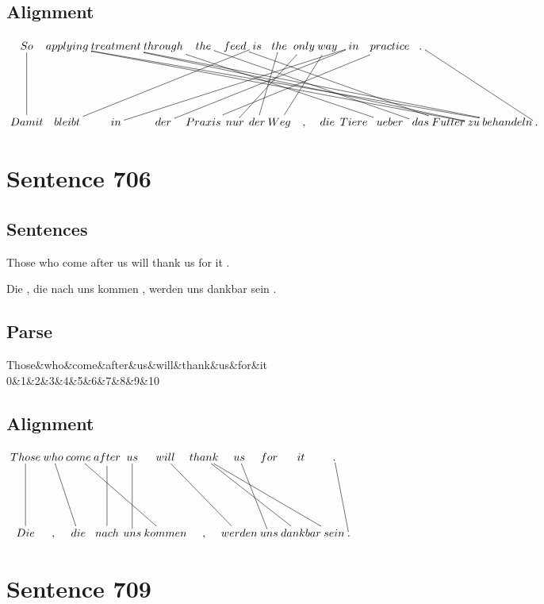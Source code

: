 \documentclass{report}
\begin{document}
\subsection*{Alignment}
\scriptsize{
$
\xymatrix@C-2.3pc{
So \ar @{-} [dd] & applying \ar @{-} [ddrrrrrrrrrrrrr] \ar @{-} [ddrrrrrrrrrrrrrr] & treatment \ar @{-} [ddrrrrrrrrrrrrr] \ar @{-} [ddrrrrrrrrrrrr] & through \ar @{-} [ddrrrrrrrr] & the \ar @{-} [ddrrrrrrrr] & feed \ar @{-} [ddrrrrrrrr] & is \ar @{-} [ddlllll] & the \ar @{-} [ddl] & only \ar @{-} [ddlll] & way \ar @{-} [ddll] & in \ar @{-} [ddlllllll] \ar @{-} [ddllllllll] & practice \ar @{-} [ddlllllll] & . \ar @{-} [ddrrrr]\\\\
Damit & bleibt & in & der & Praxis & nur & der & Weg & , & die & Tiere & ueber & das & Futter & zu & behandeln & .
}$}
\newpage\section*{Sentence 706}

\subsection*{Sentences}
Those who come after us will thank us for it .

\noindent Die , die nach uns kommen , werden uns dankbar sein .



\subsection*{Parse}
\begin{dependency}[theme=simple]
\begin{deptext}[column sep=.5cm, row sep=.1ex]
Those\&who\&come\&after\&us\&will\&thank\&us\&for\&it\\
0\&1\&2\&3\&4\&5\&6\&7\&8\&9\&10\\
\end{deptext}
\end{dependency}


\subsection*{Alignment}
\scriptsize{
$
\xymatrix@C-2.3pc{
Those \ar @{-} [dd] & who \ar @{-} [ddr] & come \ar @{-} [ddrrr] & after \ar @{-} [dd] & us \ar @{-} [dd] & will \ar @{-} [ddrr] & thank \ar @{-} [ddrrrr] \ar @{-} [ddrrr] & us \ar @{-} [ddr] & for & it & . \ar @{-} [ddr]\\\\
Die & , & die & nach & uns & kommen & , & werden & uns & dankbar & sein & .
}$}
\newpage\section*{Sentence 709}
\end{document}

